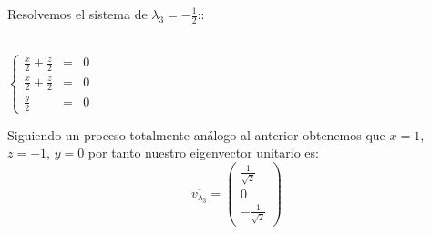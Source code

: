 \documentclass[11pt,letterpaper]{article}
\begin{document}
    Resolvemos el sistema de $\lambda_3=-\frac{1}{2}$::\,\\
    \,\\
     \begin{center}
     $\left\{ 
         \begin{array}{rcl}
            \frac{x}{2}+\frac{z}{2}&=&0\\
            \frac{x}{2}+\frac{z}{2}&=&0\\
            \frac{y}{2}&=&0
         \end{array}
       \right.$\,\\
        \end{center}
    Siguiendo un proceso totalmente an\'alogo al anterior  obtenemos que $x=1$, $z=-1$, $y=0$
    por tanto
    nuestro eigenvector unitario es:
    \,\\
    \begin{equation*}
        \overline{v_{\lambda_3}}=\begin{pmatrix}
                \frac{1}{\sqrt{2}}\\
                0\\
                -\frac{1}{\sqrt{2}}
                \end{pmatrix}
    \end{equation*}\,\\
    
\end{document}
